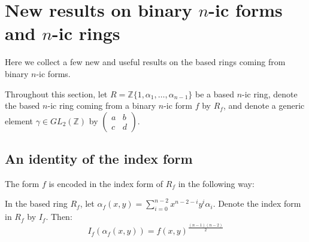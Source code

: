 \documentclass{report}
\begin{document}
\chapter{New results on binary $n$-ic forms and $n$-ic rings}

Here we collect a few new and useful results on the based rings coming from binary $n$-ic forms.

Throughout this section, let $R = \mathbb{Z}\{1,\alpha_1,\ldots,\alpha_{n-1}\}$ be a based $n$-ic ring, denote the based $n$-ic ring coming from a binary $n$-ic form $f$ by $R_f$, and denote a generic element $\gamma \in GL_2(\mathbb{Z})$ by $\begin{pmatrix} a & b \\ c & d \end{pmatrix}$.

\section{An identity of the index form}

The form $f$ is encoded in the index form of $R_f$ in the following way:

\begin{theorem}
In the based ring $R_f$, let $\alpha_f(x,y) = \sum_{i=0}^{n-2} x^{n-2-i} y^i \alpha_i$.  Denote the index form in $R_f$ by $I_f$.  Then:
\begin{equation}
I_f(\alpha_f(x,y)) = f(x,y)^{\frac{(n-1)(n-2)}{2}}
\end{equation}
\end{theorem}
\end{document}
